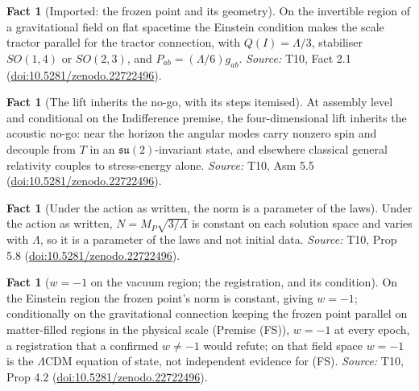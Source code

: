 \documentclass[11pt]{article}
\theoremstyle{definition}
\newtheorem{fact}[theorem]{Fact}
\theoremstyle{plain}
\newcommand{\changedmark}[2]{\marginpar{\raggedright\scriptsize\color{#1}#2}}
\begin{document}
\begin{fact}[Imported: the frozen point and its geometry]\label{c:dark-energy.imported-frozen-point-geometry}
On the invertible region of a gravitational field on flat spacetime the Einstein condition makes the scale tractor parallel for the tractor connection, with $Q(I) = \Lambda/3$, stabiliser $SO(1,4)$ or $SO(2,3)$, and $P_{ab} = (\Lambda/6)g_{ab}$.
\emph{Source:} T10, Fact 2.1 (\href{https://doi.org/10.5281/zenodo.22722496}{doi:10.5281/zenodo.22722496}).
\end{fact}

\begin{fact}[The lift inherits the no-go, with its steps itemised]\label{c:dark-energy.lift-inherits-no-go-steps-itemised}
At assembly level and conditional on the Indifference premise, the four-dimensional lift inherits the acoustic no-go: near the horizon the angular modes carry nonzero spin and decouple from $T$ in an $\mathfrak{su}(2)$-invariant state, and elsewhere classical general relativity couples to stress-energy alone.
\emph{Source:} T10, Asm 5.5 (\href{https://doi.org/10.5281/zenodo.22722496}{doi:10.5281/zenodo.22722496}).
\end{fact}

\begin{fact}[Under the action as written, the norm is a parameter of the laws]\label{c:dark-energy.under-action-written-norm-parameter-laws}
Under the action as written, $N = M_P\sqrt{3/\Lambda}$ is constant on each solution space and varies with $\Lambda$, so it is a parameter of the laws and not initial data.
\emph{Source:} T10, Prop 5.8 (\href{https://doi.org/10.5281/zenodo.22722496}{doi:10.5281/zenodo.22722496}).
\end{fact}

\begin{fact}[$w = -1$ on the vacuum region; the registration, and its condition]\label{c:dark-energy.vacuum-region-registration-condition}
\changedmark{BurntOrange}{changed since the deposit}
On the Einstein region the frozen point's norm is constant, giving $w = -1$; conditionally on the gravitational connection keeping the frozen point parallel on matter-filled regions in the physical scale (Premise (FS)), $w = -1$ at every epoch, a registration that a confirmed $w\neq -1$ would refute; on that field space $w = -1$ is the $\Lambda$CDM equation of state, not independent evidence for (FS).
\emph{Source:} T10, Prop 4.2 (\href{https://doi.org/10.5281/zenodo.22722496}{doi:10.5281/zenodo.22722496}).
\end{fact}
\end{document}

